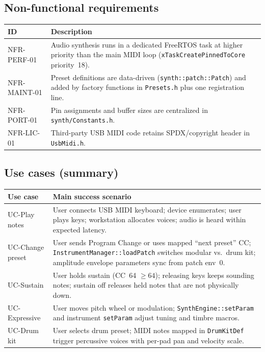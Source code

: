 \documentclass[11pt,a4paper]{article}
\begin{document}
\subsection{Non-functional requirements}
\begin{longtable}{p{}p{}}
\toprule
\textbf{ID} & \textbf{Description} \\
\midrule
\endhead
NFR-PERF-01 &
Audio synthesis runs in a dedicated FreeRTOS task at higher priority than the main MIDI loop (\texttt{xTaskCreatePinnedToCore} priority~18). \\
NFR-MAINT-01 &
Preset definitions are data-driven (\texttt{synth::patch::Patch}) and added by factory functions in \texttt{Presets.h} plus one registration line. \\
NFR-PORT-01 &
Pin assignments and buffer sizes are centralized in \texttt{synth/Constants.h}. \\
NFR-LIC-01 &
Third-party USB MIDI code retains SPDX/copyright header in \texttt{UsbMidi.h}. \\
\bottomrule
\end{longtable}

\subsection{Use cases (summary)}
\begin{longtable}{p{}p{}}
\toprule
\textbf{Use case} & \textbf{Main success scenario} \\
\midrule
\endhead
UC-Play notes &
User connects USB MIDI keyboard; device enumerates; user plays keys; workstation allocates voices; audio is heard within expected latency. \\
UC-Change preset &
User sends Program Change or uses mapped ``next preset'' CC; \texttt{InstrumentManager::loadPatch} switches modular vs.\ drum kit; amplitude envelope parameters sync from patch env~0. \\
UC-Sustain &
User holds sustain (CC~64 $\geq 64$); releasing keys keeps sounding notes; sustain off releases held notes that are not physically down. \\
UC-Expressive &
User moves pitch wheel or modulation; \texttt{SynthEngine::setParam} and instrument \texttt{setParam} adjust tuning and timbre macros. \\
UC-Drum kit &
User selects drum preset; MIDI notes mapped in \texttt{DrumKitDef} trigger percussive voices with per-pad pan and velocity scale. \\
\bottomrule
\end{longtable}
\end{document}
